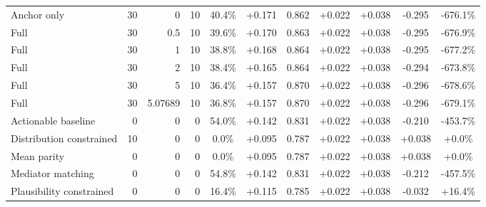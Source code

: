\begin{table}[htbp]
\begin{tabular}{lrrrccccccc}
Anchor only & 30 & 0 & 10 & 40.4\% & +0.171 & 0.862 & +0.022 & +0.038 & -0.295 & -676.1\% \\
Full & 30 & 0.5 & 10 & 39.6\% & +0.170 & 0.863 & +0.022 & +0.038 & -0.295 & -676.9\% \\
Full & 30 & 1 & 10 & 38.8\% & +0.168 & 0.864 & +0.022 & +0.038 & -0.295 & -677.2\% \\
Full & 30 & 2 & 10 & 38.4\% & +0.165 & 0.864 & +0.022 & +0.038 & -0.294 & -673.8\% \\
Full & 30 & 5 & 10 & 36.4\% & +0.157 & 0.870 & +0.022 & +0.038 & -0.296 & -678.6\% \\
Full & 30 & 5.07689 & 10 & 36.8\% & +0.157 & 0.870 & +0.022 & +0.038 & -0.296 & -679.1\% \\
Actionable baseline & 0 & 0 & 0 & 54.0\% & +0.142 & 0.831 & +0.022 & +0.038 & -0.210 & -453.7\% \\
Distribution constrained & 10 & 0 & 0 & 0.0\% & +0.095 & 0.787 & +0.022 & +0.038 & +0.038 & +0.0\% \\
Mean parity & 0 & 0 & 0 & 0.0\% & +0.095 & 0.787 & +0.022 & +0.038 & +0.038 & +0.0\% \\
Mediator matching & 0 & 0 & 0 & 54.8\% & +0.142 & 0.831 & +0.022 & +0.038 & -0.212 & -457.5\% \\
Plausibility constrained & 0 & 0 & 0 & 16.4\% & +0.115 & 0.785 & +0.022 & +0.038 & -0.032 & +16.4\% \\
\bottomrule
\end{tabular}
\end{table}
